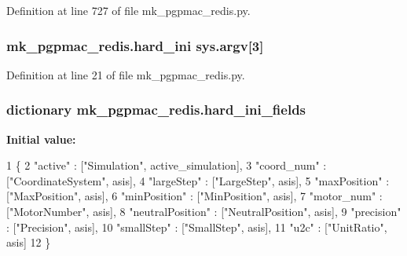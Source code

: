 Definition at line 727 of file mk\-\_\-pgpmac\-\_\-redis.\-py.

\hypertarget{namespacemk__pgpmac__redis_a5864d9c27cbe61534756880cbfebe4f1}{
\subsubsection[{hard\-\_\-ini}]{\setlength{\rightskip}{0pt plus 5cm}mk\-\_\-pgpmac\-\_\-redis.\-hard\-\_\-ini sys.\-argv\mbox{[}3\mbox{]}}}\label{namespacemk__pgpmac__redis_a5864d9c27cbe61534756880cbfebe4f1}


Definition at line 21 of file mk\-\_\-pgpmac\-\_\-redis.\-py.

\hypertarget{namespacemk__pgpmac__redis_a8257226983aee079ec66f5cc67e194ec}{
\subsubsection[{hard\-\_\-ini\-\_\-fields}]{\setlength{\rightskip}{0pt plus 5cm}dictionary mk\-\_\-pgpmac\-\_\-redis.\-hard\-\_\-ini\-\_\-fields}}\label{namespacemk__pgpmac__redis_a8257226983aee079ec66f5cc67e194ec}
{\bfseries Initial value\-:}
\begin{DoxyCode}
1 \{
2     \textcolor{stringliteral}{"active"}          : [\textcolor{stringliteral}{"Simulation"}, active\_simulation],
3     \textcolor{stringliteral}{"coord\_num"}       : [\textcolor{stringliteral}{"CoordinateSystem"}, asis],
4     \textcolor{stringliteral}{"largeStep"}       : [\textcolor{stringliteral}{"LargeStep"}, asis],
5     \textcolor{stringliteral}{"maxPosition"}     : [\textcolor{stringliteral}{"MaxPosition"}, asis],
6     \textcolor{stringliteral}{"minPosition"}     : [\textcolor{stringliteral}{"MinPosition"}, asis],
7     \textcolor{stringliteral}{"motor\_num"}       : [\textcolor{stringliteral}{"MotorNumber"}, asis],
8     \textcolor{stringliteral}{"neutralPosition"} : [\textcolor{stringliteral}{"NeutralPosition"}, asis],
9     \textcolor{stringliteral}{"precision"}       : [\textcolor{stringliteral}{"Precision"}, asis],
10     \textcolor{stringliteral}{"smallStep"}       : [\textcolor{stringliteral}{"SmallStep"}, asis],
11     \textcolor{stringliteral}{"u2c"}             : [\textcolor{stringliteral}{"UnitRatio"}, asis]
12     \}
\end{DoxyCode}


